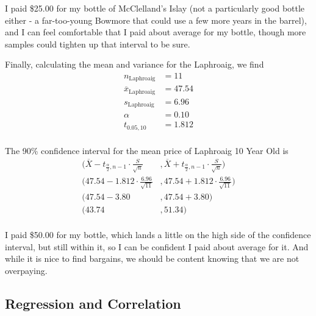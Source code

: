 I paid \$25.00 for my bottle of McClelland's Islay (not a particularly good bottle either - a far-too-young Bowmore that could use a few more years in the barrel), and I can feel comfortable that I paid about average for my bottle, though more samples could tighten up that interval to be sure.

Finally, calculating the mean and variance for the Laphroaig, we find
\begin{equation*}
\begin{split}
    n_{\text{Laphroaig}} &= 11\\
    \overline{x}_{\text{Laphroaig}} &= 47.54\\
    s_{\text{Laphroaig}} &= 6.96\\
    \alpha &= 0.10\\
    t_{0.05, 10} &= 1.812\\
\end{split}
\end{equation*}

The 90\% confidence interval for the mean price of Laphroaig 10 Year Old is
\begin{equation*}
\begin{split}
    \bigg( \overline{X} - t_{\frac{\alpha}{2}, n - 1} \cdot \frac{S}{\sqrt{n}}
    &, 
    \overline{X} + t_{\frac{\alpha}{2}, n - 1} \cdot \frac{S}{\sqrt{n}} \bigg)\\
    \bigg( 47.54 - 1.812  \cdot \frac{6.96}{\sqrt{11}}
    &, 
    47.54 + 1.812  \cdot \frac{6.96}{\sqrt{11}} \bigg)\\
    (47.54 - 3.80 &, 47.54 + 3.80)\\
    (43.74 &, 51.34)\\
\end{split}
\end{equation*}

I paid \$50.00 for my bottle, which lands a little on the high side of the confidence interval, but still within it, so I can be confident I paid about average for it. And while it is nice to find bargains, we should be content knowing that we are not overpaying.

\pagebreak

\subsection{Regression and Correlation}

